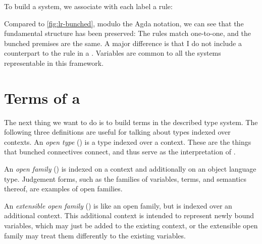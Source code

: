 \noindent
\begin{minipage}[t]{0.5\textwidth}
\end{minipage}
\begin{minipage}[t]{0.5\textwidth}
\end{minipage}

To build a system, we associate with each label a rule:


Compared to \cref{fig:lr-bunched}, modulo the Agda notation, we can see
that the fundamental structure has been preserved: The rules match
one-to-one, and the bunched premises are the same. A major difference
is that I do not include a counterpart to the
 rule in a
. Variables are common to all the systems
representable in this framework.

\section{Terms of a }\label{sec:terms-of-system}

The next thing we want to do is to build terms in the described type system.
The following three definitions are useful for talking about types indexed over
contexts.
An \emph{open type} () is a type
indexed over a context.
These are the things that bunched connectives connect, and thus serve as the
interpretation of .


An \emph{open family} () is
indexed on a context and additionally on an object language type.
Judgement forms, such as the families of variables, terms, and semantics
thereof, are examples of open families.


An \emph{extensible open family} ()
is like an open family, but is indexed over an additional context.
This additional context is intended to represent newly bound variables, which
may just be added to the existing context, or the extensible open family may
treat them differently to the existing variables.


